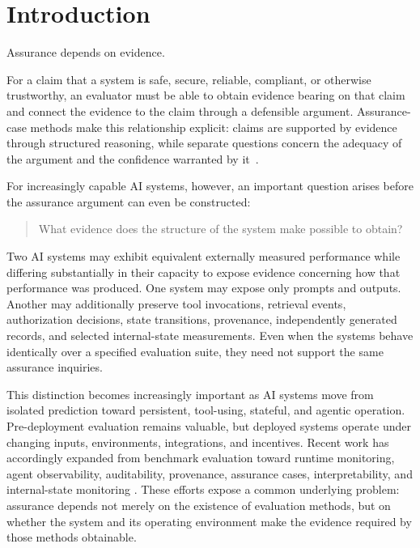 \section{Introduction}
\label{aa.sec.intro}

Assurance depends on evidence.

For a claim that a system is safe, secure, reliable, compliant, or otherwise trustworthy,
an evaluator must be able to obtain evidence bearing on that claim and connect the evidence to the claim through a defensible argument.
Assurance-case methods make this relationship explicit: claims are supported by evidence through structured reasoning,
while separate questions concern the adequacy of the argument and the confidence warranted
by it~\cite{goodenough2012confidence,bloomfield2010safetycases}.

For increasingly capable AI systems, however, an important question arises before the assurance argument can even be constructed:

\begin{quote}
  What evidence does the structure of the system make possible to obtain?
\end{quote}

Two AI systems may exhibit equivalent externally measured performance while differing substantially
in their capacity to expose evidence concerning how that performance was produced.
One system may expose only prompts and outputs.
Another may additionally preserve tool invocations, retrieval events, authorization decisions,
state transitions, provenance, independently generated records, and selected internal-state measurements.
Even when the systems behave identically over a specified evaluation suite, they need not support the same assurance inquiries.

This distinction becomes increasingly important as AI systems move from isolated prediction toward persistent,
tool-using, stateful, and agentic operation.
Pre-deployment evaluation remains valuable, but deployed systems operate under changing inputs, environments, integrations, and incentives.
Recent work has accordingly expanded from benchmark evaluation toward runtime monitoring,
agent observability, auditability, provenance, assurance cases, interpretability, and
internal-state monitoring \cite{nist2026monitoring,fernsel2024auditability,openai2025cotmonitorability,nistAgenticProbes2026}.
These efforts expose a common underlying problem: assurance depends not merely on the existence of evaluation methods,
but on whether the system and its operating environment make the evidence required by those methods obtainable.

